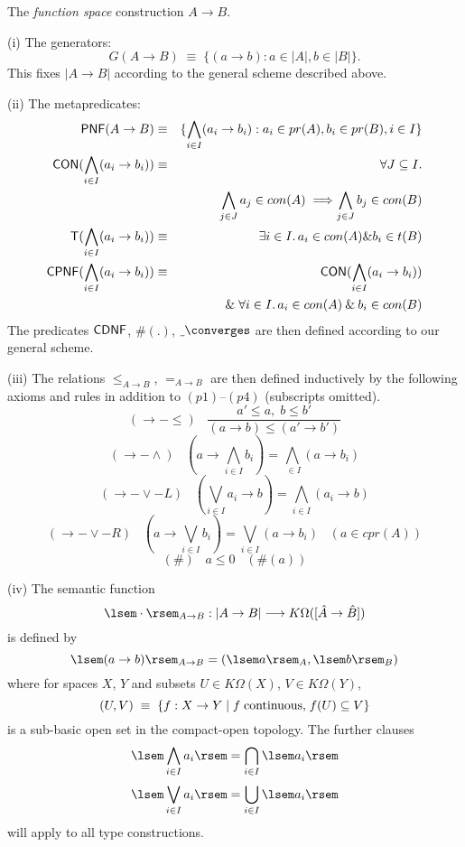 \begin{definition} 
{\rm The {\em function space} construction $A \rightarrow B$.

\noindent (i) The generators:
\[ G(A \rightarrow B) \; \equiv \; \{ (a \rightarrow b) : a \in |A|, b \in |B| \}. \]
This fixes $|A \rightarrow B|$ according to the general scheme described above.

\noindent (ii) The metapredicates:
\begin{eqnarray*}
{\sf PNF}(A \rightarrow B) & \equiv & \{\bigwedge_{i \in I}(a_{i} \rightarrow b_{i}) : a_{i} \in pr(A), b_{i} \in pr(B), i \in I \} \\
{\sf CON}(\bigwedge_{i \in I}(a_{i} \rightarrow b_{i})) & \equiv & \forall J \subseteq I. \\ 
& & \bigwedge_{j \in J}a_{j} \in con(A) \; \Longrightarrow \bigwedge_{j \in J}b_{j} \in con(B) \\
{\sf T}(\bigwedge_{i \in I}(a_{i} \rightarrow b_{i})) & \equiv & \exists i \in I. \, a_{i} \in con(A) \& b_{i} \in t(B) \\
{\sf CPNF}(\bigwedge_{i \in I}(a_{i} \rightarrow b_{i})) & \equiv & {\sf CON}(\bigwedge_{i \in I}(a_{i} \rightarrow b_{i})) \\ 
& & \& \; \forall i \in I. \, a_{i} \in con(A) \:
\& \: b_{i} \in con(B)
\end{eqnarray*}
The predicates ${\sf CDNF}$, $\#(.)$, $\underline{\ }\converges$ are then defined according to our general scheme.

\noindent (iii) The relations $\leq_{A \rightarrow B}$, $=_{A \rightarrow B}$ are then defined inductively by the following axioms and rules in addition to $(p1)$--$(p4)$ (subscripts omitted).
\[ (\rightarrow - \leq ) \;\;\; \frac{a' \leq a, \; b \leq b'}{(a \rightarrow b) \leq (a' \rightarrow b' )} \]
\[ (\rightarrow - \wedge) \;\;\; (a \rightarrow \bigwedge_{i \in I}b_{i}) = \bigwedge_{\ \in I}(a \rightarrow b_{i}) \]
\[ (\rightarrow - \vee - L) \;\;\; (\bigvee_{i \in I}a_{i} \rightarrow b) = \bigwedge_{i \in I}(a_{i} \rightarrow b) \]
\[ (\rightarrow - \vee - R) \;\;\;  (a \rightarrow \bigvee_{i \in I}b_{i}) = \bigvee_{i \in I}(a \rightarrow b_{i}) \;\;\; (a \in cpr(A)) \]
\[ (\#) \;\;\; a \leq 0 \;\;\; (\#(a)) \] 

\noindent (iv) The semantic function
\[ \lsem \cdot \rsem_{A \rightarrow B} : |A \rightarrow B| \longrightarrow K\Omega ([\hat{A} \rightarrow \hat{B}]) \]
is defined by
\[ \lsem (a \rightarrow b) \rsem_{A \rightarrow B} = (\lsem a \rsem_{A}, \lsem b \rsem_{B}) \]
where for spaces $X$, $Y$ and subsets $U \in K\Omega (X)$, $V \in K\Omega (Y)$,
\[ (U,V) \; \equiv \; \{ f : X \rightarrow Y \; | \; f \; {\rm continuous,} \; f(U) \subseteq V \} \]
is a sub-basic open set in the compact-open topology. The further clauses
\[ \lsem \bigwedge_{i \in I}a_{i} \rsem = \bigcap_{i \in I} \lsem a_{i} \rsem \]
\[ \lsem \bigvee_{i \in I}a_{i} \rsem = \bigcup_{i \in I} \lsem a_{i} \rsem \]
will apply to all type constructions.}
\end{definition}

